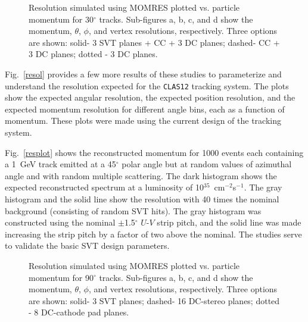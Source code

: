 \begin{figure}[htpb]
\vspace{9.0cm}
\caption{\small{Resolution simulated using MOMRES plotted vs. particle 
momentum for 30$^{\circ}$ tracks.  Sub-figures a, b, c, and d show the 
momentum, $\theta$, $\phi$, and vertex resolutions, respectively.  Three 
options are shown: solid- 3 SVT planes + CC + 3 DC planes; dashed- CC + 
3 DC planes; dotted - 3 DC planes.}}
\label{30degres}
\end{figure}

Fig.~\ref{resol} provides a few more results of these studies to
parameterize and understand the resolution expected for the {\tt CLAS12}
tracking system.  The plots show the expected angular resolution, the 
expected position resolution, and the expected momentum resolution
for different angle bins, each as a function of momentum.  These plots
were made using the current design of the tracking system.

Fig.~\ref{resplot} shows the reconstructed momentum for 1000 events
each containing a 1~GeV track emitted at a 45$^{\circ}$ polar angle
but at random values of azimuthal angle and with random multiple
scattering.  The dark histogram shows the expected reconstructed
spectrum at a luminosity of 10$^{35}$~cm$^{-2}$s$^{-1}$.  The gray
histogram and the solid line show the resolution with 40 times the
nominal background (consisting of random SVT hits).  The gray histogram
was constructed using the nominal $\pm$1.5$^{\circ}$ $U$-$V$ strip
pitch, and the solid line was made increasing the strip pitch by a
factor of two above the nominal.  The studies serve to validate the
basic SVT design parameters.

\begin{figure}[htbp]
\vspace{8.0cm}
\caption{\small{Resolution simulated using MOMRES plotted vs. particle 
momentum for 90$^{\circ}$ tracks.  Sub-figures a, b, c, and d show the 
momentum, $\theta$, $\phi$, and vertex resolutions, respectively.  Three 
options are shown: solid- 3 SVT planes; dashed- 16 DC-stereo planes; 
dotted - 8 DC-cathode pad planes.}}
\label{90degres}
\end{figure}

